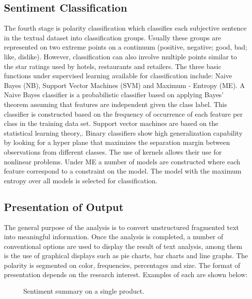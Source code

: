 \subsection{Sentiment Classification}
The fourth stage is polarity classification which classifies each subjective sentence in the
textual dataset into classification groups. Usually these groups are represented on two
extreme points on a continuum (positive, negative; good, bad; like, dislike). However,
classification can also involve multiple points similar to the star ratings used by hotels,
restaurants and retailers. The three basic functions under supervised learning available for
classification include: Naive Bayes (NB), Support Vector Machines (SVM) and Maximum
- Entropy (ME). A Naive Bayes classifier is a probabilistic classifier based on applying
Bayes’ theorem assuming that features are independent given the class label. This classifier
is constructed based on the frequency of occurrence of each feature per class in the training
data set. Support vector machines are based on the statistical learning theory,\cite{ref40}. Binary classifiers show high generalization capability by looking for a
hyper plane that maximizes the separation margin between observations from different
classes. The use of kernels allows their use for nonlinear problems. Under ME a number
of models are constructed where each feature correspond to a constraint on the model. The
model with the maximum entropy over all models is selected for classification.

\clearpage
\subsection{Presentation of Output}
The general purpose of the analysis is to convert unstructured fragmented text into
meaningful information. Once the analysis is completed, a number of conventional options
are used to display the result of text analysis, among them is the use of graphical
displays such as pie charts, bar charts and line graphs. The polarity is segmented on color,
frequencies, percentages and size. The format of presentation depends on the research
interest. Examples of each are shown below:

\begin{figure}[h]
  \centering
  \caption[Vector graphics example]%
  {Sentiment summary on a single product.}
  \label{fig:ALAP:sm3}
\end{figure}


